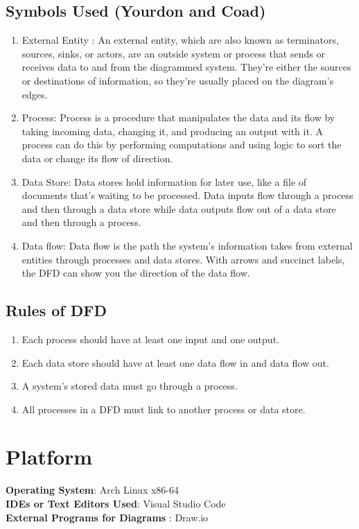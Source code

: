 \documentclass[11pt]{article}
\begin{document}
\subsection{Symbols Used (Yourdon and Coad)}
\begin{enumerate}

	\item External Entity : An external entity, which are also known as terminators, sources, sinks, or actors, are an outside system or process that sends or receives data to and from the diagrammed system. They’re either the sources or destinations of information, so they’re usually placed on the diagram’s edges.
	\item Process: Process is a procedure that manipulates the data and its flow by taking incoming data, changing it, and producing an output with it. A process can do this by performing computations and using logic to sort the data or change its flow of direction.
	\item Data Store: Data stores hold information for later use, like a file of documents that’s waiting to be processed. Data inputs flow through a process and then through a data store while data outputs flow out of a data store and then through a process.
	\item Data flow: Data flow is the path the system’s information takes from external entities through processes and data stores. With arrows and succinct labels, the DFD can show you the direction of the data flow.
\end{enumerate}

\subsection{Rules of DFD}
\begin{enumerate}
	\item Each process should have at least one input and one output.
	\item Each data store should have at least one data flow in and data flow out.
	\item A system’s stored data must go through a process.
	\item All processes in a DFD must link to another process or data store.
\end{enumerate}


\section{Platform}
\textbf{Operating System}: Arch Linux x86-64 \\
\textbf{IDEs or Text Editors Used}: Visual Studio Code\\
\textbf{External Programs for Diagrams} : Draw.io\\
\end{document}
